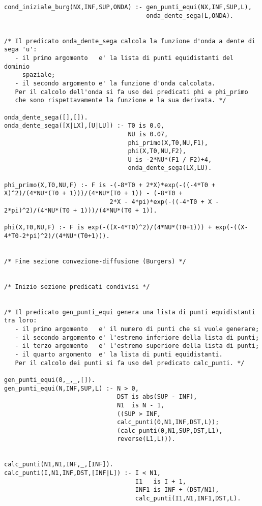 \begin{verbatim}
cond_iniziale_burg(NX,INF,SUP,ONDA) :- gen_punti_equi(NX,INF,SUP,L),
                                       onda_dente_sega(L,ONDA).


/* Il predicato onda_dente_sega calcola la funzione d'onda a dente di sega 'u':
   - il primo argomento   e' la lista di punti equidistanti del dominio
     spaziale;
   - il secondo argomento e' la funzione d'onda calcolata. 
   Per il calcolo dell'onda si fa uso dei predicati phi e phi_primo
   che sono rispettavamente la funzione e la sua derivata. */

onda_dente_sega([],[]).
onda_dente_sega([X|LX],[U|LU]) :- T0 is 0.0,
                                  NU is 0.07,
                                  phi_primo(X,T0,NU,F1),
                                  phi(X,T0,NU,F2),
                                  U is -2*NU*(F1 / F2)+4,
                                  onda_dente_sega(LX,LU).

phi_primo(X,T0,NU,F) :- F is -(-8*T0 + 2*X)*exp(-((-4*T0 + X)^2)/(4*NU*(T0 + 1)))/(4*NU*(T0 + 1)) - (-8*T0 +
                             2*X - 4*pi)*exp(-((-4*T0 + X - 2*pi)^2)/(4*NU*(T0 + 1)))/(4*NU*(T0 + 1)).

phi(X,T0,NU,F) :- F is exp(-((X-4*T0)^2)/(4*NU*(T0+1))) + exp(-((X-4*T0-2*pi)^2)/(4*NU*(T0+1))).


/* Fine sezione convezione-diffusione (Burgers) */


/* Inizio sezione predicati condivisi */


/* Il predicato gen_punti_equi genera una lista di punti equidistanti tra loro:
   - il primo argomento   e' il numero di punti che si vuole generare;
   - il secondo argomento e' l'estremo inferiore della lista di punti;
   - il terzo argomento   e' l'estremo superiore della lista di punti;
   - il quarto argomento  e' la lista di punti equidistanti. 
   Per il calcolo dei punti si fa uso del predicato calc_punti. */

gen_punti_equi(0,_,_,[]).
gen_punti_equi(N,INF,SUP,L) :- N > 0,
                               DST is abs(SUP - INF),
                               N1  is N - 1,
                               ((SUP > INF,
                               calc_punti(0,N1,INF,DST,L));
                               (calc_punti(0,N1,SUP,DST,L1),
                               reverse(L1,L))).


calc_punti(N1,N1,INF,_,[INF]).
calc_punti(I,N1,INF,DST,[INF|L]) :- I < N1,
                                    I1   is I + 1,
                                    INF1 is INF + (DST/N1),
                                    calc_punti(I1,N1,INF1,DST,L).


\end{verbatim}
